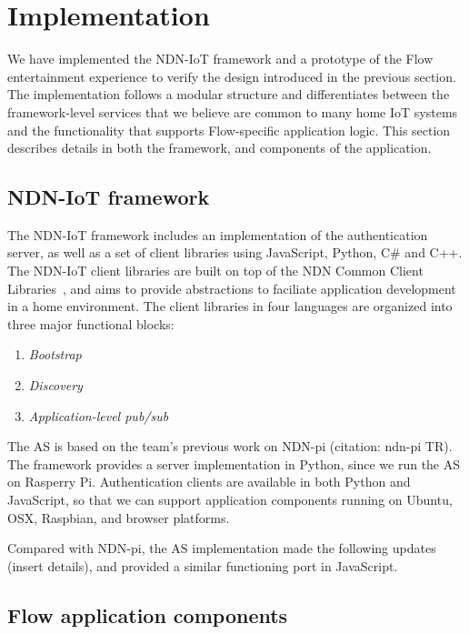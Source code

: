 \section{Implementation}
\label{sec:implementation}

We have implemented the NDN-IoT framework and a prototype of the Flow entertainment experience to verify the design introduced in the previous section.
The implementation follows a modular structure and differentiates between the framework-level services that we believe are common to many home IoT systems and the functionality that supports Flow-specific application logic.
This section describes details in both the framework, and components of the application.

\subsection{NDN-IoT framework}

The NDN-IoT framework includes an implementation of the authentication server, as well as a set of client libraries using JavaScript, Python, C\# and C++.
The NDN-IoT client libraries are built on top of the NDN Common Client Libraries~\cite{ccl}, and aims to provide abstractions to faciliate application development in a home environment. 
The client libraries in four languages are organized into three major functional blocks:
\begin{enumerate}
\item \textit{Bootstrap}
\item \textit{Discovery}
\item \textit{Application-level pub/sub}
\end{enumerate}

The AS is based on the team's previous work on NDN-pi (citation: ndn-pi TR). The framework provides a server implementation in Python, since we run the AS on Rasperry Pi. Authentication clients are available in both Python and JavaScript, so that we can support application components running on Ubuntu, OSX, Raspbian, and browser platforms.

Compared with NDN-pi, the AS implementation made the following updates (insert details), and provided a similar functioning port in JavaScript.

\subsection{Flow application components}

